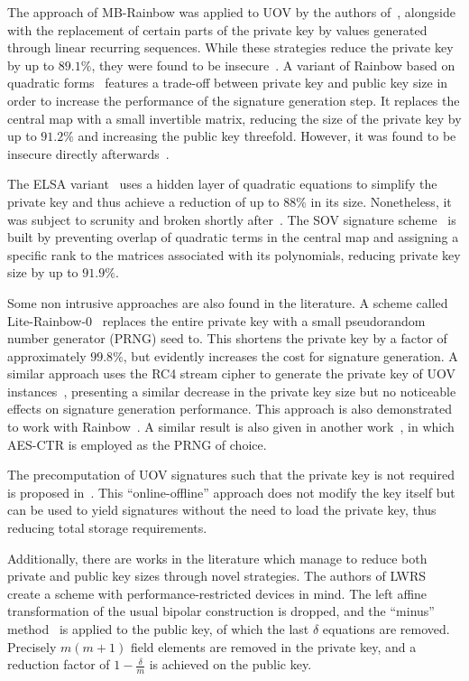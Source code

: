 \documentclass[draft, 12pt, a4paper, oneside]{memoir}
\begin{document}
The approach of MB-Rainbow was applied to UOV by the authors of~\cite{}, alongside with the replacement of certain parts of the private key by values generated through linear recurring sequences. While these strategies reduce the private key by up to $89.1\%$, they were found to be insecure~\cite{}. A variant of Rainbow based on quadratic forms~\cite{} features a trade-off between private key and public key size in order to increase the performance of the signature generation step. It replaces the central map with a small invertible matrix, reducing the size of the private key by up to $91.2\%$ and increasing the public key threefold. However, it was found to be insecure directly afterwards~\cite{}.

The ELSA variant~\cite{} uses a hidden layer of quadratic equations to simplify the private key and thus achieve a reduction of up to $88\%$ in its size. Nonetheless, it was subject to scrunity and broken shortly after~\cite{}. The SOV signature scheme~\cite{} is built by preventing overlap of quadratic terms in the central map and assigning a specific rank to the matrices associated with its polynomials, reducing private key size by up to $91.9\%$.

Some non intrusive approaches are also found in the literature. A scheme called Lite-Rainbow-0~\cite{} replaces the entire private key with a small pseudorandom number generator (PRNG) seed to. This shortens the private key by a factor of approximately $99.8\%$, but evidently increases the cost for signature generation. A similar approach uses the RC4 stream cipher to generate the private key of UOV instances~\cite{}, presenting a similar decrease in the private key size but no noticeable effects on signature generation performance. This approach is also demonstrated to work with Rainbow~\cite{}. A similar result is also given in another work~\cite{}, in which AES-CTR is employed as the PRNG of choice.

The precomputation of UOV signatures such that the private key is not required is proposed in~\cite{}. This ``online-offline'' approach does not modify the key itself but can be used to yield signatures without the need to load the private key, thus reducing total storage requirements.

Additionally, there are works in the literature which manage to reduce both private and public key sizes through novel strategies. The authors of LWRS~\cite{} create a scheme with performance-restricted devices in mind. The left affine transformation of the usual bipolar construction is dropped, and the ``minus'' method~\cite[Subsection 3.2.1]{} is applied to the public key, of which the last $\delta$ equations are removed. Precisely $m (m + 1)$ field elements are removed in the private key, and a reduction factor of $1 - \frac{\delta}{m}$ is achieved on the public key.
\end{document}
